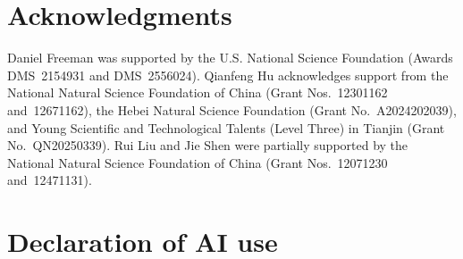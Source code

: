 \documentclass[11pt,leqno]{amsart}
\theoremstyle{compact}
\numberwithin{equation}{section}
\theoremstyle{compactremark}
\theoremstyle{compact}
\newcommand{\1}{\mathbbm{1}}
\begin{document}
\section*{Acknowledgments}

Daniel Freeman was supported by the U.S. National Science Foundation (Awards DMS~2154931 and DMS~2556024).
Qianfeng Hu acknowledges support from the National Natural Science Foundation of China (Grant Nos.~12301162 and~12671162), the Hebei Natural Science Foundation (Grant No.~A2024202039), and Young Scientific and Technological Talents (Level Three) in Tianjin (Grant No.~QN20250339).
Rui Liu and Jie Shen were partially supported by the National Natural Science Foundation of China (Grant Nos.~12071230 and~12471131).

\section*{Declaration of AI use}
\end{document}
